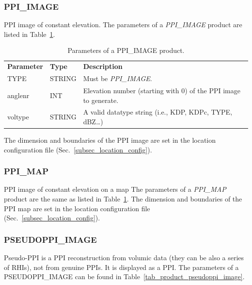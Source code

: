 \documentclass[a4paper,11pt,pdftex,twoside]{scrartcl}
\renewcommand{\bf}{\normalfont \bfseries}
\begin{document}
{{{\subsubsection{PPI\_IMAGE}
   \label{subsec_ppi_image}

 PPI image of constant elevation.
The parameters of a \emph{PPI\_IMAGE} product are listed in Table~\ref{tab_product_ppi_image}.

\begin{table}[H]
 \begin{tabularx}{\textwidth}{llX}
 \bf{Parameter}  & \bf{Type}  & \bf{Description}\\
 TYPE           & STRING     & Must be \emph{PPI\_IMAGE}.\\
 anglenr        & INT        & Elevation number (starting with 0) of the PPI image
                               to generate.\\
 voltype        & STRING     &  A valid datatype string (i.e., KDP, KDPc, TYPE, dBZ\dots)\\

 \end{tabularx}
 \caption{Parameters of a PPI\_IMAGE product.}
 \label{tab_product_ppi_image}
\end{table}
 The dimension and boundaries of the PPI image are set in the location configuration file (Sec.~\ref{subsec_location_config}).

\subsubsection{PPI\_MAP}
   \label{subsec_ppi_map}

 PPI image of constant elevation on a map
The parameters of a \emph{PPI\_MAP} product are the same as listed in Table~\ref{tab_product_ppi_image}.
 The dimension and boundaries of the PPI map are set in the location configuration file (Sec.~\ref{subsec_location_config}).
 
 
 \subsubsection{PSEUDOPPI\_IMAGE}
    \label{subsec_pseudoppi_image}
Pseudo-PPI is a PPI reconstruction from volumic data (they can be also a series of RHIs), not from genuine PPIs. 
It is displayed as a PPI. The parameters of a PSEUDOPPI\_IMAGE can be found in Table~\ref{tab_product_pseudoppi_image}.

}}}
\end{document}
